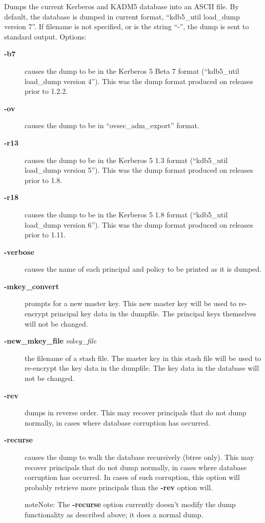 \documentclass[letterpaper,10pt,english]{sphinxmanual}
\begin{document}
Dumps the current Kerberos and KADM5 database into an ASCII file.  By
default, the database is dumped in current format, ``kdb5\_util
load\_dump version 7''.  If filename is not specified, or is the string
``-'', the dump is sent to standard output.  Options:
\begin{description}
\item[{\textbf{-b7}}] \leavevmode
causes the dump to be in the Kerberos 5 Beta 7 format (``kdb5\_util
load\_dump version 4'').  This was the dump format produced on
releases prior to 1.2.2.

\item[{\textbf{-ov}}] \leavevmode
causes the dump to be in ``ovsec\_adm\_export'' format.

\item[{\textbf{-r13}}] \leavevmode
causes the dump to be in the Kerberos 5 1.3 format (``kdb5\_util
load\_dump version 5'').  This was the dump format produced on
releases prior to 1.8.

\item[{\textbf{-r18}}] \leavevmode
causes the dump to be in the Kerberos 5 1.8 format (``kdb5\_util
load\_dump version 6'').  This was the dump format produced on
releases prior to 1.11.

\item[{\textbf{-verbose}}] \leavevmode
causes the name of each principal and policy to be printed as it
is dumped.

\item[{\textbf{-mkey\_convert}}] \leavevmode
prompts for a new master key.  This new master key will be used to
re-encrypt principal key data in the dumpfile.  The principal keys
themselves will not be changed.

\item[{\textbf{-new\_mkey\_file} \emph{mkey\_file}}] \leavevmode
the filename of a stash file.  The master key in this stash file
will be used to re-encrypt the key data in the dumpfile.  The key
data in the database will not be changed.

\item[{\textbf{-rev}}] \leavevmode
dumps in reverse order.  This may recover principals that do not
dump normally, in cases where database corruption has occurred.

\item[{\textbf{-recurse}}] \leavevmode
causes the dump to walk the database recursively (btree only).
This may recover principals that do not dump normally, in cases
where database corruption has occurred.  In cases of such
corruption, this option will probably retrieve more principals
than the \textbf{-rev} option will.

\begin{notice}{note}{Note:}
The \textbf{-recurse} option currently doesn't modify the dump
functionality as described above; it does a normal dump.
\end{notice}


\end{description}
\end{document}
